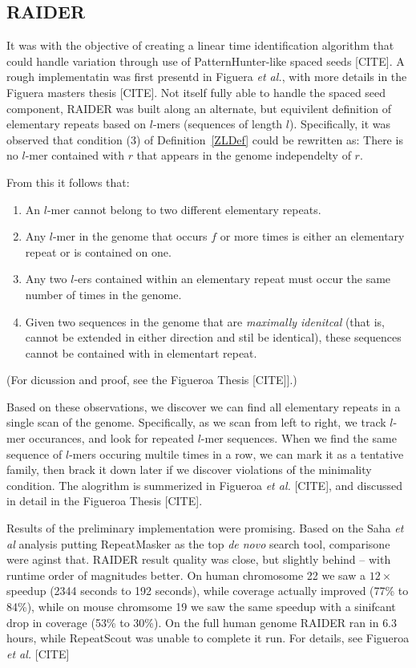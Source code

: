 \documentclass{bmcart}
\begin{document}
\subsection*{RAIDER}
It was with the objective of creating a linear time identification
algorithm that could handle variation through use of
PatternHunter-like spaced seeds [CITE].  A rough implementatin was
first presentd in Figuera {\it et al.}, with more details in the
Figuera masters thesis [CITE].  Not itself fully able to handle the
spaced seed component, RAIDER was built along an alternate,
but equivilent definition of elementary repeats based on $l$-mers
(sequences of length $l$).  Specifically, it was observed that
condition (3) of Definition~\ref{ZLDef} could be rewritten as: There
is no $l$-mer contained with $r$ that appears in the genome
independelty of $r$.

From this it follows that:
\begin{enumerate}
\item An $l$-mer cannot belong to two different elementary repeats.
\item Any $l$-mer in the genome that occurs $f$ or more times is
  either an elementary repeat or is contained on one.
\item Any two $l$-ers contained within an elementary repeat must occur
  the same number of times in the genome.
\item Given two sequences in the genome that are {\it maximally
  idenitcal} (that is, cannot be extended in either direction and stil
  be identical), these sequences cannot be contained with in
  elementart repeat.
\end{enumerate}
(For dicussion and proof, see the Figueroa Thesis [CITE]].)

Based on these observations, we discover we can find all elementary
repeats in a single scan of the genome.  Specifically, as we scan from
left to right, we track $l$-mer occurances, and look for repeated
$l$-mer sequences.  When we find the same sequence of $l$-mers
occuring multile times in a row, we can mark it as a tentative family,
then brack it down later if we discover violations of the minimality
condition.  The alogrithm is summerized in Figueroa {\it et al.} [CITE], and
discussed in detail in the Figueroa Thesis [CITE].

Results of the preliminary implementation were promising.  Based on
the Saha {\it et al} analysis putting RepeatMasker as the top {\it de
  novo} search tool, comparisone were aginst that.  RAIDER result
quality was close, but slightly behind -- with runtime
order of magnitudes better.  On human chromosome 22 we saw a
$12\times$ speedup (2344 seconds to 192 seconds), while coverage
actually improved (77\% to 84\%), while on mouse chromsome 19 we saw 
the same speedup with a sinifcant drop in coverage (53\% to 30\%).  On
the full human genome RAIDER ran in $6.3$ hours, while RepeatScout was
unable to complete it run.  For details, see Figueroa {\it et al.} [CITE]
\end{document}
